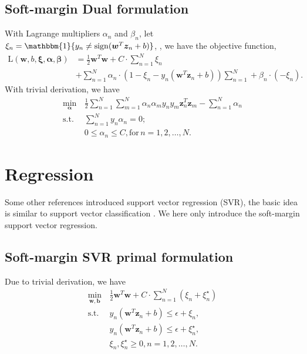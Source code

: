 \documentclass[11pt, a4paper, reqno, twoside]{scrartcl}
\theoremstyle{style}
\DeclareMathOperator*{\sign}{sign}
\newcommand{\0}{\mathbf{0}} %
\newcommand{\bw}{\bm{w}}
\newcommand{\bb}{\bm{b}}
\newcommand{\balpha}{\bm{\alpha}}
\newcommand{\bbeta}{\bm{\beta}}
\newcommand{\bxi}{\bm{\xi}}
\newcommand{\bz}{\bm{z}}
\begin{document}
\subsection{Soft-margin Dual formulation}
With Lagrange multipliers $\alpha_n$ and $\beta_n$, let $\xi_n =  \mathbbm{1}\{ y_n \neq \sign(\bw^T \bz_n + b) \}$, , we have the objective function,
\begin{equation}
\begin{aligned}
\mathrm{L}(\bw, b,\bxi, \balpha, \bbeta) &= \frac{1}{2} \bw^T \bw + C \cdot \sum_{n=1}^N \xi_n \\
													&+ \sum_{n=1}^N \alpha_n \cdot (1- \xi_n - y_n (\bw^T \bz_n + b)) \sum_{n=1}^N + \beta_n \cdot (- \xi_n).
\end{aligned}
\end{equation}
With trivial derivation, we have
\begin{equation}
\begin{aligned}
\min_{\balpha} \, &\frac{1}{2} \sum_{n=1}^N \sum_{m=1}^N \alpha_n \alpha_m y_n y_m \bz_n^T \bz_m - \sum_{n=1}^N \alpha_n \\ 
\mathrm{s.t. }   \,                & \sum_{n=1}^N y_n \alpha_n =0; \\
									 & 0 \leq \alpha_n \leq C,  \mathrm{for }\,  n=1, 2, \ldots, N. 
\end{aligned}
\end{equation}


\section{Regression}
Some other references introduced support vector regression (SVR), the basic idea is similar to support vector classification \cite{smola2004tutorial}. We here only introduce the soft-margin support vector regression.

\subsection{Soft-margin SVR primal formulation}
Due to trivial derivation, we have 
\begin{equation}
\begin{aligned}
\min_{\bw,\bb} \, &\frac{1}{2} \bw^T \bw  + C \cdot \sum_{n=1}^N  (\xi_n + \xi^\star_n) \\
\mathrm{s.t. }   \,                & y_n (\bw^T \bz_n + b) \leq \epsilon + \xi_n, \\
										& y_n (\bw^T \bz_n + b) \leq \epsilon +  \xi^\star_n ,\\
										& \xi_n, \xi^\star_n \geq 0, n = 1, 2, \ldots, N.
\end{aligned}
\end{equation}
\end{document}
